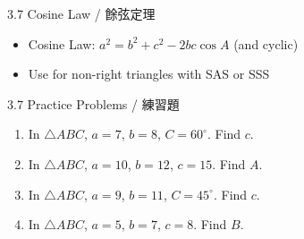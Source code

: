 \documentclass[aspectratio=169]{beamer}
\begin{document}
\begin{frame}{3.7 Cosine Law / 餘弦定理}
    \begin{tcolorbox}[colback=lightgray,colframe=primary,title=Key Points]
        \footnotesize
        \begin{itemize}
            \item Cosine Law: $a^2 = b^2 + c^2 - 2bc\cos A$ (and cyclic)
            \item Use for non-right triangles with SAS or SSS
        \end{itemize}
    \end{tcolorbox}
    \vspace{0.5em}
    \begin{center}
    \end{center}
\end{frame}

\begin{frame}{3.7 Practice Problems / 練習題}
    \begin{tcolorbox}[colback=lightgray,colframe=accent,title=Practice]
        \footnotesize
        \begin{enumerate}
            \item In $\triangle ABC$, $a=7$, $b=8$, $C=60^\circ$. Find $c$.
            \item In $\triangle ABC$, $a=10$, $b=12$, $c=15$. Find $A$.
            \item In $\triangle ABC$, $a=9$, $b=11$, $C=45^\circ$. Find $c$.
            \item In $\triangle ABC$, $a=5$, $b=7$, $c=8$. Find $B$.
        \end{enumerate}
    \end{tcolorbox}
\end{frame}
\end{document}
